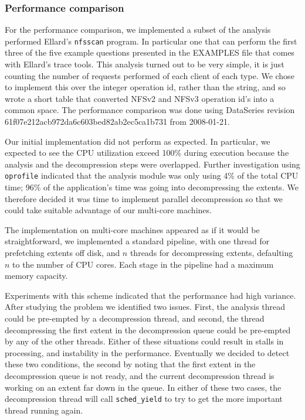 \subsubsection{Performance comparison}

For the performance comparison, we implemented a subset of the
analysis performed Ellard's \texttt{nfsscan} program. In particular one
that can perform the first three of the five example questions
presented in the EXAMPLES file that comes with Ellard's trace tools.
This analysis turned out to be very simple, it is just counting the
number of requests performed of each client of each type.  We chose to
implement this over the integer operation id, rather than the string,
and so wrote a short table that converted NFSv2 and NFSv3 operation
id's into a common space. The performance comparison was done using
DataSeries revision 61f07e212acb972da6c603bed82ab2ec5ca1b731 from
2008-01-21.

Our initial implementation did not perform as expected.  In particular,
we expected to see
the CPU utilization exceed 100\% during execution because the
analysis and the decompression steps were overlapped.  Further
investigation using \texttt{oprofile} indicated that the analysis module was
only using 4\% of the total CPU time; 96\% of the application's time
was going into decompressing the extents.  We therefore decided it was
time to implement parallel decompression so that we could take
suitable advantage of our multi-core machines.

The implementation on multi-core machines appeared as if it would be
straightforward, we implemented a standard pipeline, with one thread for
prefetching extents off disk, and $n$ threads for decompressing
extents, defaulting $n$ to the number of CPU cores.  Each stage in the
pipeline had a maximum memory capacity.

Experiments with this scheme indicated that the performance had high
variance.  After studying the problem we identified two issues.
First, the analysis thread could be pre-empted by a decompression
thread, and second, the thread decompressing the first extent in the
decompression queue could be pre-empted by any of the other threads.
Either of these situations could result in stalls in processing, and
instability in the performance.  Eventually we decided to detect
these two conditions, the second by noting that the first extent in
the decompression queue is not ready, and the current decompression
thread is working on an extent far down in the queue.  In either of
these two cases, the decompression thread will call \texttt{sched\_yield} to
try to get the more important thread running again.

